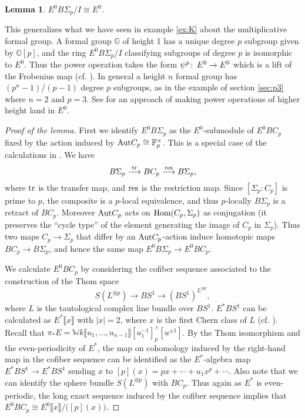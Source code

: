 \documentclass{gtpart}
\newtheorem{lem}[thm]{Lemma}
\theoremstyle{definition}
\theoremstyle{remark}
\def\co{\colon\thinspace}
\newcommand{\mb}[1]{\mathbb{#1}}
\newcommand{\Hom}{\ensuremath{{\rm Hom}}}
\begin{document}
\begin{lem}
\label{lem:cong}
 $E^0 B\Sigma_p/I \cong E^0$.  
\end{lem}
This generalizes what we have seen in example \ref{ex:K} about the 
multiplicative formal group.  A formal group $\mb G$ of height 1 has a unique 
degree $p$ subgroup given by ${\mb G}[p]$, and the ring $E^0 B\Sigma_p/I$ 
classifying subgroups of degree $p$ is isomorphic to $E^0$.  Thus the power 
operation takes the form $\psi^p\co E^0 \to E^0$ which is a lift of the 
Frobenius map (cf. \cite[section 4]{k1}).  In general a height $n$ formal 
group has $(p^n-1)/(p-1)$ degree $p$ subgroups, as in the example of section 
\ref{sec:p3} where $n=2$ and $p=3$.  See \cite[section 3.5]{Andu} for an 
approach of making power operations of higher height land in $E^0$.  
\begin{proof}[Proof of the lemma]
 First we identify $E^0 B\Sigma_p$ as the $E^0$-submodule of $E^0 BC_p$ fixed 
 by the action induced by ${\rm Aut} C_p \cong {\mb F}_p^\times$. This is a 
 special case of the calculations in \cite[section 12]{lpo}.  We have 
 \[
  B\Sigma_p \stackrel{\rm tr}{\longrightarrow} BC_p 
  \stackrel{\rm res}{\longrightarrow} B\Sigma_p, 
 \]
 where $\rm tr$ is the transfer map, and $\rm res$ is the restriction map.  
 Since $[\Sigma_p : C_p]$ is prime to $p$, the composite is a $p$-local 
 equivalence, and thus $p$-locally $B\Sigma_p$ is a retract of $BC_p$.  
 Moreover ${\rm Aut} C_p$ acts on $\Hom (C_p,\Sigma_p)$ as conjugation (it 
 preserves the ``cycle type'' of the element generating the image of $C_p$ in 
 $\Sigma_p$).  Thus two maps $C_p \to \Sigma_p$ that differ by an 
 ${\rm Aut} C_p$-action induce homotopic maps $BC_p \to B\Sigma_p$, and hence 
 the same map $E^0 B\Sigma_p \to E^0 BC_p$.  

 We calculate $E^0 BC_p$ by considering the cofiber sequence associated to the 
 construction of the Thom space 
 \[
  S(L^{\otimes p}) \to BS^1 \to (BS^1)^{L^{\otimes p}}, 
 \]
 where $L$ is the tautological complex line bundle over $BS^1$.  $E^* BS^1$ 
 can be calculated as $E^* \llbracket x \rrbracket$ with $|x| = 2$, where $x$ 
 is the first Chern class of $L$ (cf. \cite[section 1]{coctalos}).  Recall 
 that $\pi_* E = {\mb W}k \llbracket u_1,...,u_{n-1} \rrbracket 
 [u_1^{-1}]_p^\wedge [u^{\pm1}]$.  By the Thom isomorphism and the 
 even-periodicity of $E^*$, the map on cohomology induced by the right-hand 
 map in the cofiber sequence can be identified as the $E^*$-algebra map 
 $E^* BS^1 \to E^* BS^1$ sending $x$ to $[p](x) = p x + \cdots + u_1 x^p + 
 \cdots$.  Also note that we can identify the sphere bundle $S(L^{\otimes p})$ 
 with $BC_p$.  Thus again as $E^*$ is even-periodic, the long exact sequence 
 induced by the cofiber sequence implies that $E^0 BC_p \cong 
 E^0 \llbracket x \rrbracket / \big([p](x)\big)$.  


\end{proof}
\end{document}
